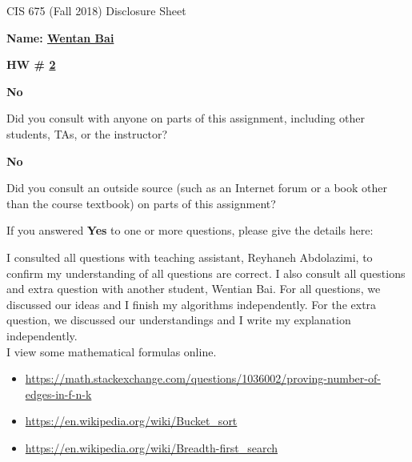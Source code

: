 \documentclass[12pt]{article}
\newcommand*\circled[1]{\tikz[baseline=(char.base)]{
            \node[shape=circle,draw,inner sep=2pt] (char) {#1};}}
\begin{document}
\begin{center}
  \Large
  CIS 675 (Fall 2018) Disclosure Sheet 
\end{center} 
\vspace*{2em}

\noindent
\textbf{\Large Name: \underline{ Wentan Bai }} 


\noindent 
\begin{minipage}[t]{1.0\linewidth}

\begin{minipage}[t]{0.25\linewidth}
\textbf{\Large
  HW \# \underline{ 2 }
} 

\end{minipage} \vspace*{3ex}




\begin{minipage}[t]{.8in}
  \textbf{\circled{Yes} \quad No}
\end{minipage}
\qquad 
\begin{minipage}[t]{5.5in}
  Did you consult with anyone on parts of this assignment, including other students, TAs, or the instructor? 
\end{minipage}
\vspace*{1ex}

\begin{minipage}[t]{.8in}
  \textbf{\circled{Yes} \quad No}
\end{minipage}
\qquad 
\begin{minipage}[t]{5.5in}
  Did you consult an outside source (such as an Internet forum or a
  book other than the course textbook) on parts of this assignment? 
\end{minipage}
\vspace*{1ex}

\noindent
  If you answered \textbf{Yes} to one or more questions, please give the details here: \vspace*{5ex} \par
  I consulted all questions with teaching assistant, Reyhaneh Abdolazimi, to confirm my understanding of all questions are correct. 
  I also consult all questions and extra question with another student, Wentian Bai. For all questions, we discussed our ideas and I finish my algorithms independently. 
  For the extra question, we discussed our understandings and I write my explanation independently.  \vspace*{5ex} \\

  I view some mathematical formulas online.
  \begin{itemize}
    \item \href{url}{https://math.stackexchange.com/questions/1036002/proving-number-of-edges-in-f-n-k} 
    \item \href{url}{https://en.wikipedia.org/wiki/Bucket_sort} 
    \item \href{url}{https://en.wikipedia.org/wiki/Breadth-first_search} 
  \end{itemize}

\vfill
\end{minipage}
\end{document}
